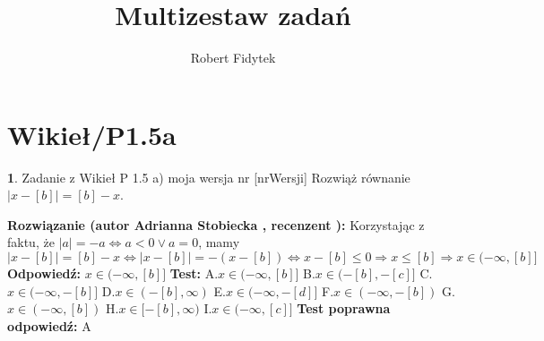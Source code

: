 \documentclass[12pt, a4paper]{article}
\title{Multizestaw zadań}
\author{Robert Fidytek}
\date{}
\theoremstyle{definition} %
\newtheorem{zad}{}
\newcommand{\kategoria}[1]{\section{#1}} %
\newcommand{\zadStart}[1]{\begin{zad}#1\newline} %
\newcommand{\zadStop}{\end{zad}}   %
\newcommand{\rozwStart}[2]{\noindent \textbf{Rozwiązanie (autor #1 , recenzent #2): }\newline} %
\newcommand{\rozwStop}{\newline}                                            %
\newcommand{\odpStart}{\noindent \textbf{Odpowiedź:}\newline}    %
\newcommand{\odpStop}{\newline}                                             %
\newcommand{\testStart}{\noindent \textbf{Test:}\newline} %
\newcommand{\testStop}{\newline} %
\newcommand{\kluczStart}{\noindent \textbf{Test poprawna odpowiedź:}\newline} %
\newcommand{\kluczStop}{\newline} %
\begin{document}
\maketitle


\kategoria{Wikieł/P1.5a}
\zadStart{Zadanie z Wikieł P 1.5 a) moja wersja nr [nrWersji]}
Rozwiąż równanie $|x-[b]|=[b]-x$.
\zadStop
\rozwStart{Adrianna Stobiecka}{}
Korzystając z faktu, że $|a|=-a\Leftrightarrow a<0 \lor a=0$, mamy
$$|x-[b]|=[b]-x\Leftrightarrow |x-[b]|=-(x-[b])\Leftrightarrow x-[b]\leq0\Rightarrow x\leq[b]\Rightarrow x\in(-\infty,[b]]$$
\rozwStop
\odpStart
$x\in(-\infty,[b]]$
\odpStop
\testStart
A.$x\in(-\infty,[b]]$
B.$x\in(-[b],-[c]]$
C.$x\in(-\infty,-[b]]$
D.$x\in(-[b],\infty)$
E.$x\in(-\infty,-[d]]$
F.$x\in(-\infty,-[b])$
G.$x\in(-\infty,[b])$
H.$x\in[-[b],\infty)$
I.$x\in(-\infty,[c]]$
\testStop
\kluczStart
A
\kluczStop
\end{document}
